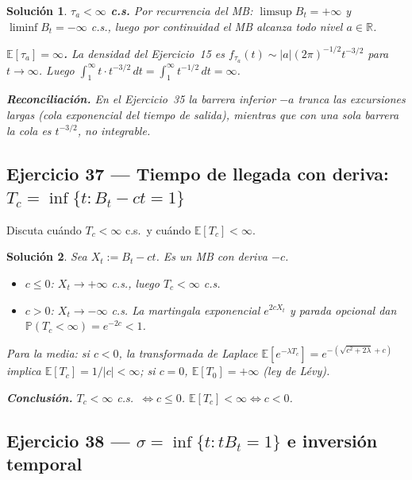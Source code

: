 \documentclass[12pt,letterpaper]{article}
\theoremstyle{ejercicio}
\theoremstyle{solucion}
\newtheorem*{solucion}{Solución}
\newcommand{\E}{\mathbb{E}}
\newcommand{\R}{\mathbb{R}}
\renewcommand{\P}{\mathbb{P}}
\begin{document}
\begin{solucion}
\textbf{$\tau_a<\infty$ c.s.} Por recurrencia del MB: $\limsup B_t=+\infty$ y
$\liminf B_t=-\infty$ c.s., luego por continuidad el MB alcanza todo nivel $a\in\R$.

\textbf{$\E[\tau_a]=\infty$.} La densidad del Ejercicio~15 es $f_{\tau_a}(t)\sim|a|(2\pi)^{-1/2}t^{-3/2}$
para $t\to\infty$. Luego $\int_1^\infty t\cdot t^{-3/2}\,dt=\int_1^\infty t^{-1/2}\,dt=\infty$.

\textbf{Reconciliación.} En el Ejercicio~35 la barrera inferior $-a$ trunca las excursiones largas
(cola exponencial del tiempo de salida), mientras que con una sola barrera la cola es $t^{-3/2}$,
no integrable.
\end{solucion}

\subsection*{Ejercicio 37 — Tiempo de llegada con deriva: $T_c=\inf\{t:B_t-ct=1\}$}

\begin{recuadro}
Discuta cuándo $T_c<\infty$ c.s.\ y cuándo $\E[T_c]<\infty$.
\end{recuadro}

\begin{solucion}
Sea $X_t:=B_t-ct$. Es un MB con deriva $-c$.
\begin{itemize}[leftmargin=*]
\item $c\le 0$: $X_t\to+\infty$ c.s., luego $T_c<\infty$ c.s.
\item $c>0$: $X_t\to-\infty$ c.s. La martingala exponencial $e^{2cX_t}$ y parada opcional dan
  $\P(T_c<\infty)=e^{-2c}<1$.
\end{itemize}
Para la media: si $c<0$, la transformada de Laplace $\E[e^{-\lambda T_c}]=e^{-({\sqrt{c^2+2\lambda}+c})}$
implica $\E[T_c]=1/|c|<\infty$; si $c=0$, $\E[T_0]=+\infty$ (ley de Lévy).

\textbf{Conclusión.} $T_c<\infty$ c.s.\ $\iff c\le 0$. $\E[T_c]<\infty\iff c<0$.
\end{solucion}

\subsection*{Ejercicio 38 — $\sigma=\inf\{t:tB_t=1\}$ e inversión temporal}
\end{document}
